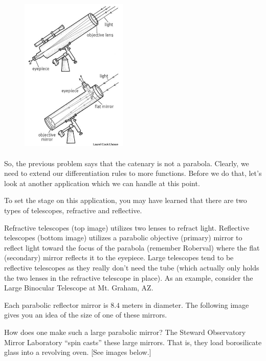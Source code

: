 \begin{figure}
\captionsetup{labelformat=empty}
\centerline{\includegraphics*[height=3in,width=2in]{Figures/RefractiveAndReflectiveTelescopes}}
\label{fig:}
\end{figure}
So, the previous problem says that the catenary is not a parabola.
Clearly, we need to extend our differentiation rules to more
functions.  Before we do that, let's look at another application which
we can handle at this point.  

To set the stage on this application, you may have learned that there
are two types of telescopes, refractive and reflective.

Refractive telescopes (top image) utilizes two lenses to refract
light.  Reflective telescopes (bottom image) utilizes a parabolic
objective (primary) mirror to reflect light toward the focus of the
parabola (remember Roberval) where the flat (secondary) mirror
reflects it to the eyepiece.  Large telescopes tend to be reflective
telescopes as they really don't need the tube (which actually only
holds the two lenses in the refractive telescope in place).  As an
example, consider the Large Binocular Telescope at Mt. Graham, AZ. 

Each parabolic reflector mirror is $8.4$ meters in diameter.  The
following image gives you an idea of the size of one of these mirrors.

How does one make such a large parabolic mirror?  The Steward
Observatory Mirror Laboratory ``spin casts'' these large mirrors.  That
is, they load borosilicate glass into a revolving oven.  [See images
below.]   

